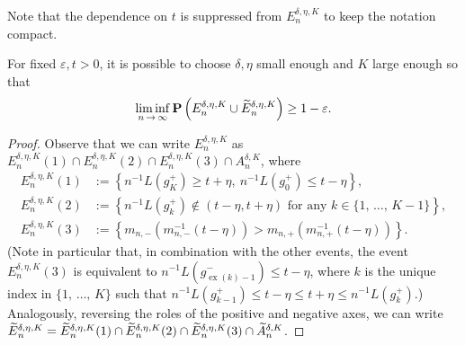 \documentclass[AHL,Unicode,longabstracts,published]{cedram}
\newcommand{\bfP}{\mathbf{P}}
\newcommand\ex{\operatorname{ex}}
\newcommand{\gtt}[1]{g_{\ex(#1)-1}^-}
\let\oldtilde\tilde
\renewcommand*{\tilde}[1]{\mathchoice{\widetilde{#1}}{\widetilde{#1}}{\oldtilde{#1}}{\oldtilde{#1}}}
\begin{document}
Note that the dependence on $t$ is suppressed from $E_n^{\delta,\eta,K}$ to keep the notation compact.
\begin{prop}\label{prop:Ewhp}
For fixed $\varepsilon,t>0$, it is possible to choose $\delta, \eta$ small enough and $K$ large enough so that
\begin{align}\label{eq:Ewhp}
\liminf_{n\,\to\,\infty}\bfP\left({E}_n^{\delta,\eta,K}\cup \tilde{E}_n^{\delta,\eta,K}\right)\geq 1-\varepsilon.
\end{align}
\end{prop}
\begin{proof}
Observe that we can write $E_n^{\delta,\eta,K}$ as $E_n^{\delta,\eta,K}(1)\cap E_n^{\delta,\eta,K}(2)\cap E_n^{\delta,\eta,K}(3)\cap A_n^{\delta,K}$, where
\begin{align*}
E_n^{\delta,\eta,K}(1)&:=\left\{n^{-1}L\left(g_K^+\right)\geq t+\eta,\:n^{-1}L\left(g_0^+\right)\leq t-\eta\right\},\\
E_n^{\delta,\eta,K}(2)&:=\left\{n^{-1}L\left(g_k^+\right)\not\in(t-\eta,t+\eta)\text{ for any }k\in \{1,\,\dots,\,K-1\}\right\},\\
E_n^{\delta,\eta,K}(3)&:=\left\{m_{n,-}\left(m_{n,-}^{-1}(t-\eta)\right)> m_{n,+}\left(m_{n,+}^{-1}(t-\eta)\right)\right\}.
\end{align*}
(Note in particular that, in combination with the other events, the event $E_n^{\delta,\eta,K}(3)$ is equivalent to $n^{-1}L(\gtt{k})\leq t-\eta$, where $k$ is the unique index in $\{1,\,\dots,\,K\}$ such that $n^{-1}L(g_{k-1}^+)\leq t-\eta\leq t+\eta\leq n^{-1}L(g_k^+)$.) Analogously, reversing the roles of the positive and negative axes, we can write $\tilde{E}_n^{\delta,\eta,K}= \tilde{E}_n^{\delta,\eta,K}(1)\cap \tilde{E}_n^{\delta,\eta,K}(2)\cap\tilde{E}_n^{\delta,\eta,K}(3) \cap \tilde{A}_n^{\delta,K}$.


\end{proof}
\end{document}

